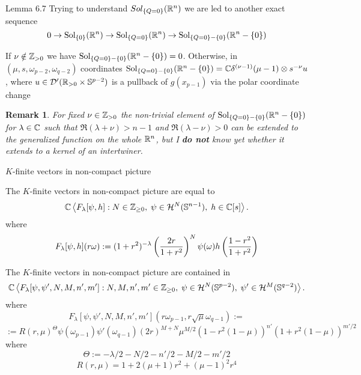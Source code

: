 \documentclass[8pt]{beamer}
\newcommand{\Sol}{\mbox{Sol}}
\theoremstyle{mystyle}
\newtheorem*{remark}{Remark}
\begin{document}
\begin{frame}{Lemma 6.7}
	Trying to understand $Sol_{\left\{Q=0\right\}}(\mathbb{R}^n)$ we are led to another exact sequence
	\[0\rightarrow\Sol_{\mycbra{0}}(\R^n)\rightarrow\Sol_{\mycbra{Q=0}}(\R^n)\rightarrow
	\Sol_{\mycbra{Q=0}-\mycbra{0}}(\R^n-\mycbra{0})\]

\begin{theorem}
	If $\nu\notin\mathbb{Z}_{ >0 }$ we have $\Sol_{\mycbra{Q=0}-\mycbra{0}}(\R^n-\mycbra{0})=0$. Otherwise,
	in $(\mu,s,\omega_{ p-2 },\omega_{ q-2 })$ coordinates\footnotemark
	$\Sol_{\mycbra{Q=0}-\mycbra{0}}(\R^n-\mycbra{0})=\C\delta^{ (\nu-1) }(\mu-1)
	\otimes s^{-\nu }u$, where $u\in\mathcal{ D }'(\mathbb{R}_{ >0 }\times\mathbb{ S }^{ p-2 })$
	is a pullback of $g(x_{ p-1 })$ via the polar coordinate change\footnotemark
\end{theorem}
\begin{remark}
	For fixed $\nu\in\mathbb{Z}_{ >0 }$
	the non-trivial element of $\Sol_{\mycbra{Q=0}-\mycbra{0}}(\R^n-\mycbra{0})$ for $\lambda\in\mathbb{C}$ such that 
	$\Re(\lambda+\nu)>n-1$ and $\Re(\lambda-\nu)>0$ can be extended to the generalized function on the whole $\mathbb{R}^n$,
	but I \textbf{do not} know yet whether it extends to a kernel of an intertwiner.
\end{remark}
\end{frame}
\begin{frame}{$K$-finite vectors in non-compact picture}
\begin{theorem}
	The $K$-finite vectors in non-compact picture are equal to
	\[\mathbb{C}\left< F_\lambda[\psi,h]:N\in\mathbb{Z}_{ \geq0 },\;\psi\in\mathcal{ H }^N(\mathbb{ S }^{ n-1 }),\;h\in\mathbb{C}[s] \right>.\]
	where
	\[F_\lambda[\psi,h](r\omega):=(1+r^2)^{ -\lambda }\left( \frac{ 2r }{ 1+r^2 } \right)^N\psi(\omega)h\left(\frac{ 1-r^2 }{1+r^2}\right)\]
\end{theorem}
\begin{theorem}[$O(p,q),\;n:=(p-1)+(q-1)$]
	The $K$-finite vectors in non-compact picture are contained in
	\[\mathbb{C}\left< F_\lambda[\psi,\psi',N,M,n',m']:N,M,n',m'\in\mathbb{Z}_{ \geq0 },
	\;\psi\in\mathcal{ H }^N(\mathbb{ S }^{ p-2 }),\;\psi'\in\mathcal{ H }^M(\mathbb{ S }^{ q-2 }) \right>.\]
	where
	\[F_\lambda[\psi,\psi',N,M,n',m'](r\omega_{ p-1 },r\sqrt{ \mu }\omega_{ q-1 }):=\]
	\[:=R(r,\mu)^\Theta\psi(\omega_{ p-1 })\psi'(\omega_{ q-1 })(2r)^{ M+N }\mu^{ M/2 }(1-r^2(1-\mu))^{ n' }(1+r^2(1-\mu))^
	{m'/2}\]
	where
	\[\Theta:={ -\lambda/2-N/2-n'/2-M/2-m'/2 }\]
	\[R(r,\mu)=1+2(\mu+1)r^2+(\mu-1)^2r^4\]
\end{theorem}
\end{frame}
\end{document}
